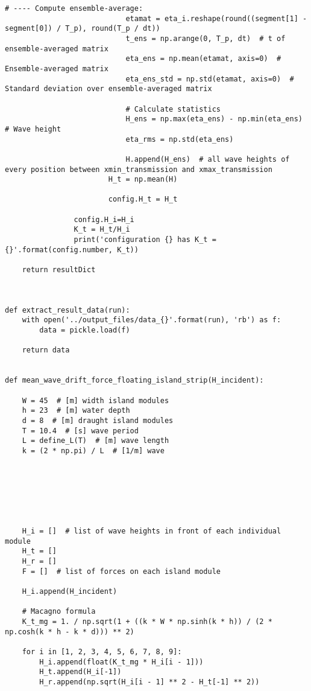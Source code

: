 \begin{mdframed}[backgroundcolor=light-gray, roundcorner=10pt,leftmargin=1, rightmargin=1, innerleftmargin=0, innertopmargin=7,innerbottommargin=0, outerlinewidth=1, linecolor=light-gray]
\begin{lstlisting}[linewidth=\columnwidth,caption=Functions used in post-processing ., label=script: post processing functions]
                            # ---- Compute ensemble-average:
                            etamat = eta_i.reshape(round((segment[1] - segment[0]) / T_p), round(T_p / dt))
                            t_ens = np.arange(0, T_p, dt)  # t of ensemble-averaged matrix
                            eta_ens = np.mean(etamat, axis=0)  # Ensemble-averaged matrix
                            eta_ens_std = np.std(etamat, axis=0)  # Standard deviation over ensemble-averaged matrix

                            # Calculate statistics
                            H_ens = np.max(eta_ens) - np.min(eta_ens)  # Wave height
                            eta_rms = np.std(eta_ens)

                            H.append(H_ens)  # all wave heights of every position between xmin_transmission and xmax_transmission
                        H_t = np.mean(H)

                        config.H_t = H_t

                config.H_i=H_i
                K_t = H_t/H_i
                print('configuration {} has K_t = {}'.format(config.number, K_t))

    return resultDict



def extract_result_data(run):
    with open('../output_files/data_{}'.format(run), 'rb') as f:
        data = pickle.load(f)

    return data


def mean_wave_drift_force_floating_island_strip(H_incident):

    W = 45  # [m] width island modules
    h = 23  # [m] water depth
    d = 8  # [m] draught island modules
    T = 10.4  # [s] wave period
    L = define_L(T)  # [m] wave length
    k = (2 * np.pi) / L  # [1/m] wave







    H_i = []  # list of wave heights in front of each individual module
    H_t = []
    H_r = []
    F = []  # list of forces on each island module

    H_i.append(H_incident)

    # Macagno formula
    K_t_mg = 1. / np.sqrt(1 + ((k * W * np.sinh(k * h)) / (2 * np.cosh(k * h - k * d))) ** 2)

    for i in [1, 2, 3, 4, 5, 6, 7, 8, 9]:
        H_i.append(float(K_t_mg * H_i[i - 1]))
        H_t.append(H_i[-1])
        H_r.append(np.sqrt(H_i[i - 1] ** 2 - H_t[-1] ** 2))


\end{lstlisting}
\end{mdframed}

